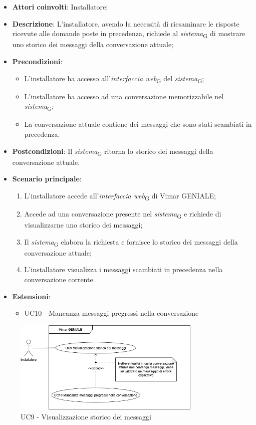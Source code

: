 \begin{itemize}
    \item \textbf{Attori coinvolti}: Installatore;
    \item \textbf{Descrizione}: L’installatore, avendo la necessità di riesaminare le risposte ricevute alle domande poste in precedenza, richiede al \textit{sistema}\textsubscript{G} di mostrare uno storico dei messaggi della conversazione attuale;
    \item \textbf{Precondizioni}: 
        \begin{itemize}
            \item L’installatore ha accesso all’\textit{interfaccia web}\textsubscript{G} del \textit{sistema}\textsubscript{G};
            \item L’installatore ha accesso ad una conversazione memorizzabile nel \textit{sistema}\textsubscript{G};
            \item La conversazione attuale contiene dei messaggi che sono stati scambiati in precedenza.
        \end{itemize}
    \item \textbf{Postcondizioni}: Il \textit{sistema}\textsubscript{G} ritorna lo storico dei messaggi della conversazione attuale.
    \item \textbf{Scenario principale}:
    \begin{enumerate}
    \item L’installatore accede all’\textit{interfaccia web}\textsubscript{G} di Vimar GENIALE;
    \item Accede ad una conversazione presente nel \textit{sistema}\textsubscript{G} e richiede di visualizzarne uno storico dei messaggi;
    \item Il \textit{sistema}\textsubscript{G} elabora la richiesta e fornisce lo storico dei messaggi della conversazione attuale;
    \item L’installatore visualizza i messaggi scambiati in precedenza nella conversazione corrente.
    \end{enumerate}
    \item \textbf{Estensioni}: 
        \begin{itemize}
            \item UC10 - Mancanza messaggi pregressi nella conversazione
        \end{itemize}
\end{itemize}
\begin{figure}[H]
\centering
\includegraphics[width=0.8\textwidth]{contents/casi_duso/png/UC9.png}
\caption{UC9 - Visualizzazione storico dei messaggi}
\end{figure}


